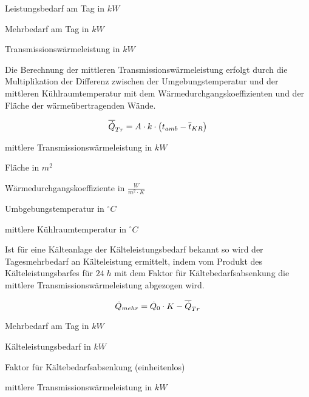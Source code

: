 \begin{description}[\dth]

	\item[$\ptag$] Leistungsbedarf am Tag in $kW$
	\item[$\pmehr$] Mehrbedarf am Tag in $kW$
	\item[$\ptrans$] Transmissionswärmeleistung in $kW$

\end{description}
\vspace{0.5cm}

Die Berechnung der mittleren Transmissionswärmeleistung erfolgt durch die
Multiplikation der Differenz zwischen der Umgebungstemperatur und der mittleren
Kühlraumtemperatur mit dem Wärmedurchgangskoeffizienten und der Fläche der
wärmeübertragenden Wände.

\begin{equation}
	\aptrans = A \cdot k \cdot \left( t_{amb} -
	\overline{t}_{KR} \right)
	\label{aptrans}
\end{equation}

\begin{description}[\dth]

	\item[$\aptrans$] mittlere Transmissionswärmeleistung in $kW$
	\item[$A$] Fläche in $m^2$
	\item[$k$] Wärmedurchgangskoeffiziente in $\frac{W}{m^2 \cdot K}$
	\item[$t_{amb}$] Umbgebungstemperatur in $^{\circ}C$
	\item[$\overline{t}_{KR}$] mittlere Kühlraumtemperatur in
		$^{\circ}C$
\end{description}
\vspace{0.5cm}

Ist f\"ur eine K\"alteanlage der K\"alteleistungsbedarf bekannt so wird der
Tagesmehrbedarf an K\"alteleistung ermittelt, indem vom Produkt des
K\"alteleistungsbarfes f\"ur $24\;h$ mit dem Faktor f\"ur
K\"altebedarfsabsenkung die mittlere Transmissionswärmeleistung abgezogen wird.

\begin{equation}
	\pmehr = \pkalt \cdot K - \aptrans
\label{pmehr}
\end{equation}

\begin{description}[\dth]

	\item[$\pmehr$] Mehrbedarf am Tag in $kW$
	\item[$\pkalt$] Kälteleistungsbedarf in $kW$
	\item[$K$] Faktor für Kältebedarfsabsenkung (einheitenlos)
	\item[$\aptrans$] mittlere Transmissionswärmeleistung in $kW$

\end{description}
\vspace{0.5cm}

